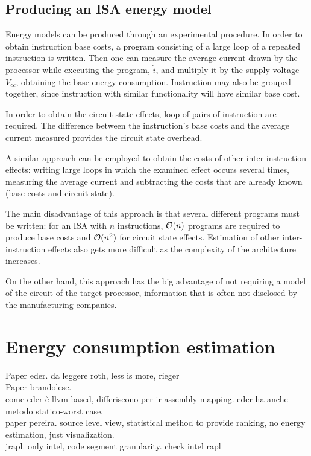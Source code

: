 \subsection{Producing an ISA energy model}
Energy models can be produced through an experimental procedure. \newline
In order to obtain instruction base costs, a program consisting of a large loop of a repeated instruction is written. Then one can measure the average current drawn by the processor while executing the program, $\hat{i}$, and multiply it by the supply voltage $V_{cc}$, obtaining the base energy consumption. \newline
Instruction may also be grouped together, since instruction with similar functionality will have similar base cost.\par 
In order to obtain the circuit state effects, loop of pairs of instruction are required. The difference between the instruction's base costs and the average current measured provides the circuit state overhead. \par 
A similar approach can be employed to obtain the costs of other inter-instruction effects: writing large loops in which the examined effect occurs several times, measuring the average current and subtracting the costs that are already known (base costs and circuit state). \par 
The main disadvantage of this approach is that several different programs must be written: for an ISA with $n$ instructions, $\mathcal{O}(n)$ programs are required to produce base costs and $\mathcal{O}(n^{2})$ for circuit state effects. \newline
Estimation of other inter-instruction effects also gets more difficult as the complexity of the architecture increases. \par
On the other hand, this approach has the big advantage of not requiring a model of the circuit of the target processor, information that is often not disclosed by the manufacturing companies.

\section{Energy consumption estimation}
Paper eder. 
da leggere roth, less is more, rieger \\
Paper brandolese. \\  come eder è llvm-based, differiscono per ir-assembly mapping. eder ha anche metodo statico-worst case. \\
paper pereira. source level view, statistical method to provide ranking, no energy estimation, just visualization. \\
jrapl. only intel, code segment granularity. check intel rapl 


